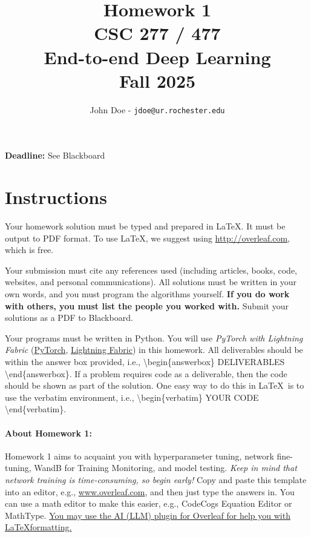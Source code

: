 \documentclass[11pt, oneside]{article}   	%
\title{Homework 1 \\ CSC 277 / 477 \\ End-to-end Deep Learning \\ Fall 2025}
\author{John Doe - \texttt{jdoe@ur.rochester.edu}}
\date{}
\begin{document}
\maketitle

\begin{center}
    \textbf{Deadline:} See Blackboard    
\end{center}


\section*{Instructions}

Your homework solution must be typed and prepared in \LaTeX. It must be output to PDF format. To use \LaTeX, we suggest using \url{http://overleaf.com}, which is free.

Your submission must cite any references used (including articles, books, code, websites, and personal communications).  All solutions must be written in your own words, and you must program the algorithms yourself. \textbf{If you do work with others, you must list the people you worked with.} Submit your solutions as a PDF to Blackboard. 


Your programs must be written in Python. You will use \emph{PyTorch with Lightning Fabric} (\href{https://docs.pytorch.org/tutorials/beginner/basics/intro.html}{PyTorch}, \href{https://lightning.ai/docs/fabric/stable/}{Lightning Fabric}) in this homework. All deliverables should be within the answer box provided, i.e., \textbackslash begin\{answerbox\} DELIVERABLES \textbackslash end\{answerbox\}. If a problem requires code as a deliverable, then the code should be shown as part of the solution. One easy way to do this in \LaTeX \, is to use the verbatim environment, i.e., \textbackslash begin\{verbatim\} YOUR CODE \textbackslash end\{verbatim\}.



\paragraph{About Homework 1:} Homework 1 aims to acquaint you with hyperparameter tuning, network fine-tuning, WandB for Training Monitoring, and model testing. \emph{Keep in mind that network training is time-consuming, so begin early!} Copy and paste this template into an editor, e.g., \url{www.overleaf.com}, and then just type the answers in. You can use a math editor to make this easier, e.g., CodeCogs Equation Editor or MathType. \href{https://blog.writefull.com/texgpt-harness-the-power-of-chatgpt-in-overleaf/}{You may use the AI (LLM) plugin for Overleaf for help you with \LaTeX formatting.}
\end{document}
